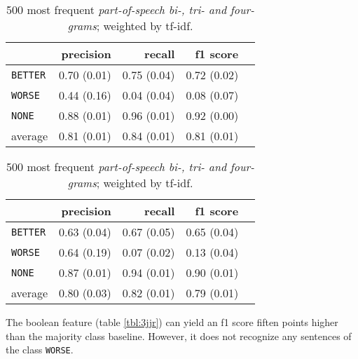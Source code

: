 \begin{table}[h]
    \begin{minipage}{.5\linewidth}
   \caption{ \emph{Mean Word Embeddings} for the middle part of the sentence. } 
    \label{tbl:3_mwe}
\begin{tabular}{@{}lrrrr@{}}
\toprule
 	&	 precision &	 recall &	 f1 score  \\ \midrule 
\texttt{BETTER}	&	 0.70 \scriptsize{(0.01)} &	 0.75 \scriptsize{(0.04)} &	 0.72 \scriptsize{(0.02)}  \\ 
\texttt{WORSE}	&	 0.44 \scriptsize{(0.16)} &	 0.04 \scriptsize{(0.04)} &	 0.08 \scriptsize{(0.07)}  \\ 
\texttt{NONE}	&	 0.88 \scriptsize{(0.01)} &	 0.96 \scriptsize{(0.01)} &	 0.92 \scriptsize{(0.00)}  \\ 
average	&	 0.81 \scriptsize{(0.01)} &	 0.84 \scriptsize{(0.01)} &	 0.81 \scriptsize{(0.01)}  \\ 
\bottomrule
\end{tabular}
  \end{minipage} \hfill
    \begin{minipage}{.5\linewidth}
  
     \caption{500 most frequent \emph{part-of-speech bi-, tri- and four-grams}; weighted by tf-idf.} 
       \label{tbl:ngram_3}
\begin{tabular}{@{}lrrrr@{}}
\toprule
 	&	 precision &	 recall &	 f1 score  \\ \midrule 
\texttt{BETTER}	&	 0.63 \scriptsize{(0.04)} &	 0.67 \scriptsize{(0.05)} &	 0.65 \scriptsize{(0.04)}  \\ 
\texttt{WORSE}	&	 0.64 \scriptsize{(0.19)} &	 0.07 \scriptsize{(0.02)} &	 0.13 \scriptsize{(0.04)}  \\ 
\texttt{NONE}	&	 0.87 \scriptsize{(0.01)} &	 0.94 \scriptsize{(0.01)} &	 0.90 \scriptsize{(0.01)}  \\ 
average	&	 0.80 \scriptsize{(0.03)} &	 0.82 \scriptsize{(0.01)} &	 0.79 \scriptsize{(0.01)}  \\ 
\bottomrule
\end{tabular}
    \end{minipage} 
\end{table}


The boolean feature (table \ref{tbl:3jjr}) can yield an f1 score fiften points higher than the majority class baseline. However, it does not recognize any sentences of the class \texttt{WORSE}.

